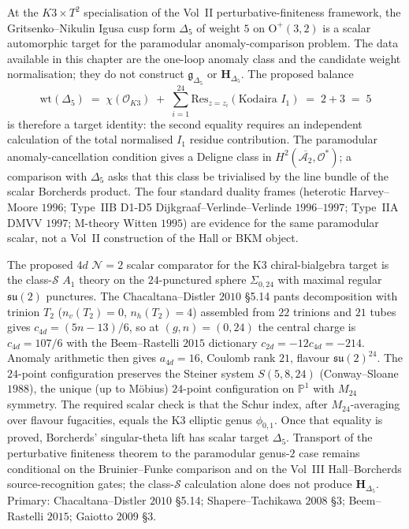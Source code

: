 \begin{remark}
\label{rem:thqg-pf-delta5-output}
At the $K3 \times T^2$ specialisation of the Vol~II perturbative-finiteness
framework, the Gritsenko--Nikulin Igusa cusp form $\Delta_5$ of weight
$5$ on $\mathrm{O}^+(3,2)$ is a scalar automorphic target for the
paramodular anomaly-comparison problem.  The data available in this
chapter are the one-loop anomaly class and the candidate weight
normalisation; they do not construct $\mathfrak g_{\Delta_5}$ or
$\mathbf H_{\Delta_5}$.  The proposed balance
\[
 \mathrm{wt}(\Delta_5) \;=\; \chi(\mathcal{O}_{K3}) \;+\; \sum_{i=1}^{24}\mathrm{Res}_{z=z_i}(\text{Kodaira } I_1) \;=\; 2 + 3 \;=\; 5
\]
is therefore a target identity: the second equality requires an
independent calculation of the total normalised $I_1$ residue
contribution.  The paramodular anomaly-cancellation condition gives a
Deligne class in $H^2(\overline{\mathcal{A}_2}, \mathcal{O}^*)$; a
comparison with $\Delta_5$ asks that this class be trivialised by the
line bundle of the scalar Borcherds product.  The four standard duality
frames (heterotic Harvey--Moore $1996$; Type~IIB D1-D5
Dijkgraaf--Verlinde--Verlinde $1996$--$1997$; Type~IIA DMVV $1997$;
M-theory Witten $1995$) are evidence for the same paramodular scalar,
not a Vol~II construction of the Hall or BKM object.
\end{remark}

\begin{remark}
\label{rem:thqg-pf-classS-parent}
The proposed $4d$ $\mathcal{N} = 2$ scalar comparator for the K3
chiral-bialgebra target is the class-$\mathcal{S}$ $A_1$ theory on the
$24$-punctured sphere
$\Sigma_{0,24}$ with maximal regular $\mathfrak{su}(2)$ punctures.
The Chacaltana--Distler $2010$ \S5.14 pants decomposition with
trinion $T_2$ ($n_v(T_2) = 0$, $n_h(T_2) = 4$) assembled from $22$
trinions and $21$ tubes gives $c_{4d} = (5n - 13)/6$, so at
$(g, n) = (0, 24)$ the central charge is $c_{4d} = 107/6$ with the
Beem--Rastelli $2015$ dictionary $c_{2d} = -12c_{4d} = -214$. Anomaly
arithmetic then gives $a_{4d} = 16$, Coulomb rank $21$, flavour
$\mathfrak{su}(2)^{24}$. The $24$-point configuration preserves the
Steiner system $S(5, 8, 24)$ (Conway--Sloane $1988$), the unique (up
to M\"obius) $24$-point configuration on $\mathbb{P}^1$ with $M_{24}$
symmetry. The required scalar check is that the Schur index, after
$M_{24}$-averaging over flavour fugacities, equals the K3 elliptic genus
$\phi_{0,1}$. Once that equality is proved, Borcherds' singular-theta
lift has scalar target $\Delta_5$. Transport of the perturbative
finiteness theorem to the paramodular genus-$2$ case remains conditional
on the Bruinier--Funke comparison and on the Vol~III Hall--Borcherds
source-recognition gates; the class-$\mathcal{S}$ calculation alone does
not produce $\mathbf H_{\Delta_5}$. Primary:
Chacaltana--Distler $2010$ \S5.14; Shapere--Tachikawa $2008$ \S3;
Beem--Rastelli $2015$; Gaiotto $2009$ \S3.
\end{remark}


